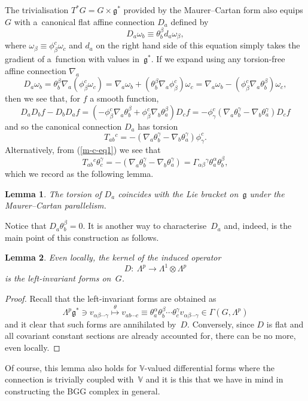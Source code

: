 \documentclass[11pt]{article}
\newtheorem{lemma}{Lemma}
\begin{document}
The trivialisation $T^*G=G\times{\mathfrak{g}}^*$ provided by the Maurer--Cartan
form also equips $G$ with a~canonical f\/lat af\/f\/ine connection $D_a$ def\/ined
by
\[D_a\omega_b\equiv\theta_b^\beta d_a\omega_\beta,\]
where $\omega_\beta\equiv\phi_\beta^c\omega_c$ and
$d_a$ on the right hand side of this equation simply takes the
gradient of a~function with values in~${\mathfrak{g}}^*$. If we expand using
any torsion-free af\/f\/ine connection $\nabla_a$
\[D_a\omega_b=\theta_b^\beta \nabla_a(\phi_\beta^c\omega_c)
=\nabla_a\omega_b+(\theta_b^\beta \nabla_a\phi_\beta^c)\omega_c
=\nabla_a\omega_b-(\phi_\beta^c\nabla_a\theta_b^\beta)\omega_c,\]
then we see that, for $f$ a smooth function,
\[D_aD_bf-D_bD_af
=(-\phi_\beta^c \nabla_a\theta_b^\beta+\phi_\beta^c \nabla_b\theta_a^\beta)D_cf
=-\phi_\gamma^c(\nabla_a\theta_b^\gamma-\nabla_b\theta_a^\gamma)D_cf\]
and so the canonical connection $D_a$ has torsion
\[T_{ab}{}^c=-(\nabla_a\theta_b^\gamma-\nabla_b\theta_a^\gamma)\phi_\gamma^c.\]
Alternatively, from (\ref{m-c-eq1}) we see that
\[T_{ab}{}^c\theta_c^\gamma=-(\nabla_a\theta_b^\gamma-\nabla_b\theta_a^\gamma)
=\Gamma_{\alpha\beta}{}^\gamma\theta_a^\alpha\theta_b^\beta,\]
which we record as the following lemma.
\begin{lemma}\label{torsion_is_bracket}
The torsion of\/ $D_a$ coincides with
the Lie bracket on\/~${\mathfrak{g}}$ under the Maurer--Cartan parallelism.
\end{lemma}
Notice that $D_a\theta_b^\beta=0$. It is another way to
characterise~$D_a$ and, indeed, is the main point of this construction as
follows.
\begin{lemma} Even locally, the kernel of the induced operator
\[D: \ \Lambda^p\to\Lambda^1\otimes\Lambda^p\]
is the left-invariant forms on~$G$.
\end{lemma}
\begin{proof}
Recall that the left-invariant forms are obtained as
\[\Lambda^p{\mathfrak{g}}^*\ni v_{\alpha\beta\cdots\gamma}
\stackrel{\theta}{\longmapsto}v_{ab\cdots c}\equiv
\theta_a^\alpha\theta_b^\beta\cdots\theta_c^\gamma
v_{\alpha\beta\cdots\gamma}\in\Gamma(G,\Lambda^p)\]
and it clear that such forms are annihilated by~$D$. Conversely, since $D$ is
f\/lat and all covariant constant sections are already accounted for, there can
be no more, even locally.
\end{proof}
\begin{remark} Of course, this lemma also holds for ${\mathbb{V}}$-valued
dif\/ferential forms where the connection is trivially coupled
with~${\mathbb{V}}$ and it is this that we have in mind in constructing
the BGG complex in general.
\end{remark}
\end{document}
